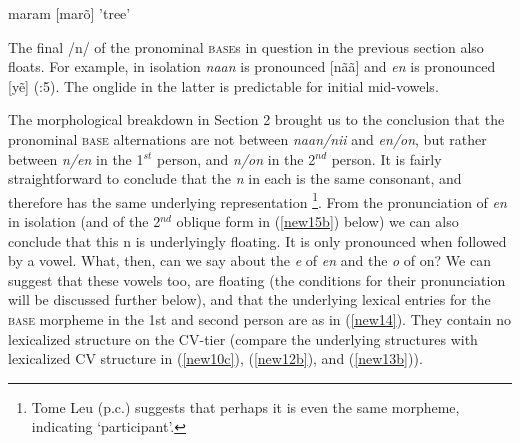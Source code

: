 \documentclass[output=paper,colorlinks,citecolor=brown,
]{langscibook}
\begin{document}
\begin{exe}
\ex \label{new13}
\begin{xlist}
\ex \label{new13a}
maram   \hspace{2cm} 	[marõ]  \hspace{2cm}	'tree' 

\ex \label{new13b}
{} 

\end{xlist}
\end{exe}

The final /n/ of the pronominal \textsc{base}s in question in the previous section also floats. For example, in isolation \textit{naan} is pronounced [nãã] and \textit{en} is pronounced [yẽ] (\citealt{schiffman1999reference}:5). The onglide in the latter is predictable for initial mid-vowels.

The morphological breakdown in Section 2 brought us to the conclusion that the pronominal \textsc{base} alternations are not between \textit{naan/nii} and \textit{en/on}, but rather between \textit{n/en} in the 1$^{st}$ person, and \textit{n/on} in the 2$^{nd}$ person. It is fairly straightforward to conclude that the \textit{n} in each is the same consonant, and therefore has the same underlying representation \footnote{Tome Leu (p.c.) suggests that perhaps it is even the same morpheme, indicating ‘participant’.}.  From the pronunciation of \textit{en} in isolation (and of the 2$^{nd}$ oblique form in (\ref{new15b}) below) we can also conclude that this n is underlyingly floating. It is only pronounced when followed by a vowel. What, then, can we say about the \textit{e} of \textit{en} and the \textit{o} of on? We can suggest that these vowels too, are floating (the conditions for their pronunciation will be discussed further below), and that the underlying lexical entries for the \textsc{base} morpheme in the 1st and second person are as in (\ref{new14}). They contain no lexicalized structure on the CV-tier (compare the underlying structures with lexicalized CV structure in (\ref{new10c}), (\ref{new12b}), and (\ref{new13b})).
\end{document}
